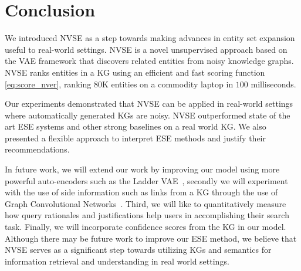 \documentclass[a4paper]{article}
\newcommand{\er}{ESE\xspace}
\newcommand{\nvge}{NVSE\xspace}
\newcommand{\mycite}[1]{\cite{#1}}%
\begin{document}
\section{Conclusion}
We introduced \nvge as a step towards making advances in entity set expansion useful to real-world settings.
\nvge is a novel unsupervised approach %
based on the VAE framework %
that discovers related entities from noisy knowledge graphs. \nvge ranks entities in a KG using an efficient and fast scoring function \eqref{eq:score_nver}, ranking 80K entities on a commodity laptop in $100$ milliseconds. 

Our experiments demonstrated that \nvge can be applied in real-world settings where automatically generated KGs
are noisy.
\nvge outperformed state of the art \er systems and other strong baselines on a real world KG. We also presented a flexible approach to interpret \er methods and justify their recommendations.
 
In future work, we will extend our work by improving our model using more powerful auto-encoders such as the Ladder VAE~\mycite{sonderby2016ladder},
secondly we will experiment with the use of side information such as links from a KG through the use of Graph Convolutional Networks~\mycite{kipf2016semi}. Third, we will like to quantitatively  measure how query rationales and justifications help users in accomplishing their search task.
Finally, we will %
incorporate confidence scores from the KG in our model. 
Although there may be future work to improve our ESE method, we believe that \nvge serves as a significant step towards 
utilizing KGs and
semantics for information retrieval and understanding in real world settings.
\end{document}
